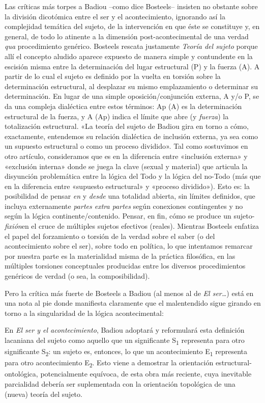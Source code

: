 Las críticas más torpes a Badiou --como dice Bosteels-- insisten no obstante sobre la división dicotómica entre el ser y el acontecimiento, ignorando así la complejidad temática del sujeto, de la intervención en que éste se constituye y, en general, de todo lo atinente a la dimensión post-acontecimental de una verdad \emph{qua} procedimiento genérico. Bosteels rescata justamente \emph{Teoría del sujeto} porque allí el concepto aludido aparece expuesto de manera simple y contundente en la escisión misma entre la determinación del lugar estructural (P) y la fuerza (A). A partir de lo cual el sujeto es definido por la vuelta en torsión sobre la determinación estructural, al desplazar su mismo emplazamiento o determinar su determinación. En lugar de una simple oposición/conjunción externa, A y/o P, se da una compleja dialéctica entre estos términos: Ap (A) es la determinación estructural de la fuerza, y A (Ap) indica el límite que abre (y \emph{fuerza}) la totalización estructural. «La teoría del sujeto de Badiou gira en torno a cómo, exactamente, entendemos su relación dialéctica de inclusión externa, ya sea como un supuesto estructural o como un proceso dividido». Tal como sostuvimos en otro artículo, consideramos que es en la diferencia entre «inclusión externa» y «exclusión interna» donde se juega la clave (sexual y material) que articula la disyunción problemática entre la lógica del Todo y la lógica del no-Todo (más que en la diferencia entre «supuesto estructural» y «proceso dividido»). Esto es: la posibilidad de pensar \emph{en} y \emph{desde} una totalidad abierta, sin límites definidos, que incluya externamente \emph{partes extra partes} según conexiones contingentes y no según la lógica continente/contenido. Pensar, en fin, cómo se produce un sujeto-\emph{fixión}en el cruce de múltiples sujetos efectivos (reales). Mientras Bosteels enfatiza el papel del forzamiento o torsión de la verdad sobre el saber (o del acontecimiento sobre el ser), sobre todo en política, lo que intentamos remarcar por nuestra parte es la materialidad misma de la práctica filosófica, en las múltiples torsiones conceptuales producidas entre los diversos procedimientos genéricos de verdad (o sea, la composibilidad).

Pero la crítica más fuerte de Bosteels a Badiou (al menos al de \emph{El ser\ldots{}}) está en una nota al pie donde manifiesta claramente que el malentendido sigue girando en torno a la singularidad de la lógica acontecimental:

En \emph{El ser y el acontecimiento}, Badiou adoptará y reformulará esta definición lacaniana del sujeto como aquello que un significante S\textsubscript{1} representa para otro significante S\textsubscript{2}: un sujeto es, entonces, lo que un acontecimiento E\textsubscript{1} representa para otro acontecimiento E\textsubscript{2}. Esto viene a demostrar la orientación estructural-ontológica, potencialmente equívoca, de esta obra más reciente, cuya inevitable parcialidad debería ser suplementada con la orientación topológica de una (nueva) teoría del sujeto.

